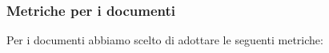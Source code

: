 \documentclass[a4paper]{article}
\begin{document}
				
				
				
				
				
			\subsubsection{Metriche per i documenti}
				Per i documenti abbiamo scelto di adottare le seguenti metriche: 
				
\end{document}
